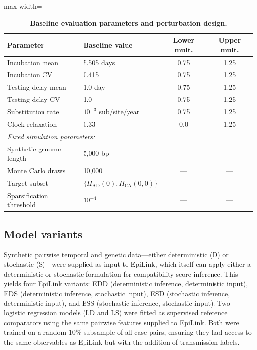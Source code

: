 \documentclass[10pt,letterpaper]{article}
\begin{document}
\begin{table}[!ht]
\caption{\textbf{Baseline evaluation parameters and perturbation design.}}
\begin{adjustbox}{max width=\textwidth}
\begin{tabular}{llcc}
\toprule
Parameter & Baseline value & Lower mult. & Upper mult. \\
\midrule
Incubation mean & 5.505 days & 0.75 & 1.25 \\
Incubation CV & 0.415 & 0.75 & 1.25 \\
Testing-delay mean & 1.0 day & 0.75 & 1.25 \\
Testing-delay CV & 1.0 & 0.75 & 1.25 \\
Substitution rate & $10^{-3}$ sub/site/year & 0.75 & 1.25 \\
Clock relaxation & 0.33 & 0.0 & 1.25 \\
\midrule
\multicolumn{4}{l}{\textit{Fixed simulation parameters:}} \\
Synthetic genome length & 5{,}000 bp &---&---\\
Monte Carlo draws & 10{,}000 &---&---\\
Target subset & $\{H_{\mathrm{AD}}(0), H_{\mathrm{CA}}(0,0)\}$ &---&---\\
Sparsification threshold & $10^{-4}$ &---&---\\
\bottomrule
\end{tabular}
\label{tab:parameters}
\end{adjustbox}
\end{table}

\subsection*{Model variants}

Synthetic pairwise temporal and genetic data---either deterministic (D) or stochastic (S)---were supplied as input to EpiLink, which itself can apply either a deterministic or stochastic formulation for compatibility score inference. This yields four EpiLink variants: EDD (deterministic inference, deterministic input), EDS (deterministic inference, stochastic input), ESD (stochastic inference, deterministic input), and ESS (stochastic inference, stochastic input). Two logistic regression models (LD and LS) were fitted as supervised reference comparators using the same pairwise features supplied to EpiLink. Both were trained on a random 10\% subsample of all case pairs, ensuring they had access to the same observables as EpiLink but with the addition of transmission labels.
\end{document}
